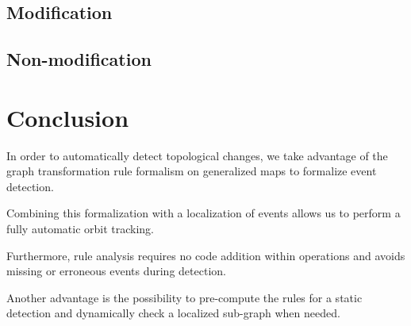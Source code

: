 \documentclass[11pt]{article}
\begin{document}
\subsection{Modification}
\label{sec:org8308eff}
\subsection{Non-modification}
\label{sec:orgc7835ed}

\section{Conclusion}
\label{sec:org8c5b7ec}
In order to automatically detect topological changes, we take advantage of the
graph transformation rule formalism on generalized maps to formalize event
detection.

Combining this formalization with a localization of events allows us to perform
a fully automatic orbit tracking.

Furthermore, rule analysis requires no code addition within operations and
avoids missing or erroneous events during detection.

Another advantage is the possibility to pre-compute the rules for a static
detection and dynamically check a localized sub-graph when needed.
\end{document}
